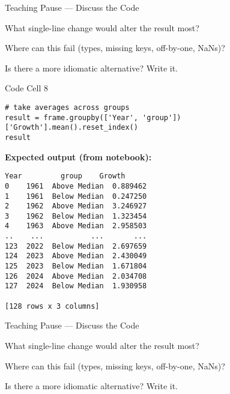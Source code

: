 \documentclass[notes,11pt, aspectratio=169, xcolor=table]{beamer}
\newenvironment{wideitemize}{\itemize\addtolength{\itemsep}{10pt}}{\enditemize}
\begin{document}
\begin{frame}{Teaching Pause — Discuss the Code}
\begin{wideitemize}
\item What single-line change would alter the result most?
\item Where can this fail (types, missing keys, off-by-one, NaNs)?
\item Is there a more idiomatic alternative? Write it.
\end{wideitemize}
\end{frame}

\begin{frame}[fragile]{Code Cell 8}
\begin{verbatim}
# take averages across groups
result = frame.groupby(['Year', 'group'])['Growth'].mean().reset_index()
result
\end{verbatim}
\vspace{0.5ex}
\textbf{Expected output (from notebook):}
\begin{verbatim}
Year         group    Growth
0    1961  Above Median  0.889462
1    1961  Below Median  0.247250
2    1962  Above Median  3.246927
3    1962  Below Median  1.323454
4    1963  Above Median  2.958503
..    ...           ...       ...
123  2022  Below Median  2.697659
124  2023  Above Median  2.430049
125  2023  Below Median  1.671804
126  2024  Above Median  2.034708
127  2024  Below Median  1.930958

[128 rows x 3 columns]
\end{verbatim}
\end{frame}

\begin{frame}{Teaching Pause — Discuss the Code}
\begin{wideitemize}
\item What single-line change would alter the result most?
\item Where can this fail (types, missing keys, off-by-one, NaNs)?
\item Is there a more idiomatic alternative? Write it.
\end{wideitemize}
\end{frame}
\end{document}
